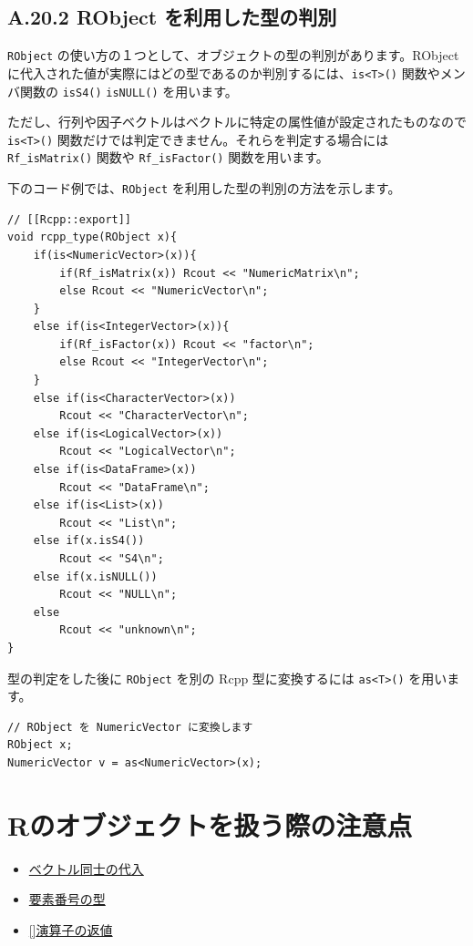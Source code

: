 \documentclass[]{book}
\providecommand{\tightlist}{%
  \setlength{\itemsep}{0pt}\setlength{\parskip}{0pt}}
\begin{document}
\hypertarget{a.20.2-robject-}{%
\section{A.20.2 RObject を利用した型の判別}\label{a.20.2-robject-}}

\texttt{RObject} の使い方の１つとして、オブジェクトの型の判別があります。RObject に代入された値が実際にはどの型であるのか判別するには、\texttt{is\textless{}T\textgreater{}()} 関数やメンバ関数の \texttt{isS4()} \texttt{isNULL()} を用います。

ただし、行列や因子ベクトルはベクトルに特定の属性値が設定されたものなので \texttt{is\textless{}T\textgreater{}()} 関数だけでは判定できません。それらを判定する場合には \texttt{Rf\_isMatrix()} 関数や \texttt{Rf\_isFactor()} 関数を用います。

下のコード例では、\texttt{RObject} を利用した型の判別の方法を示します。

\begin{verbatim}
// [[Rcpp::export]]
void rcpp_type(RObject x){
    if(is<NumericVector>(x)){
        if(Rf_isMatrix(x)) Rcout << "NumericMatrix\n";
        else Rcout << "NumericVector\n";       
    }
    else if(is<IntegerVector>(x)){
        if(Rf_isFactor(x)) Rcout << "factor\n";
        else Rcout << "IntegerVector\n";
    }
    else if(is<CharacterVector>(x))
        Rcout << "CharacterVector\n";
    else if(is<LogicalVector>(x))
        Rcout << "LogicalVector\n";
    else if(is<DataFrame>(x))
        Rcout << "DataFrame\n";
    else if(is<List>(x))
        Rcout << "List\n";
    else if(x.isS4())
        Rcout << "S4\n";
    else if(x.isNULL())
        Rcout << "NULL\n";
    else
        Rcout << "unknown\n";
}
\end{verbatim}

型の判定をした後に \texttt{RObject} を別の Rcpp 型に変換するには \texttt{as\textless{}T\textgreater{}()} を用います。

\begin{verbatim}
// RObject を NumericVector に変換します
RObject x;
NumericVector v = as<NumericVector>(x);
\end{verbatim}

\hypertarget{r}{%
\chapter{Rのオブジェクトを扱う際の注意点}\label{r}}

\begin{itemize}
\tightlist
\item
  \protect\hyperlink{ux30d9ux30afux30c8ux30ebux540cux58ebux306eux4ee3ux5165}{ベクトル同士の代入}
\item
  \protect\hyperlink{}{要素番号の型}
\item
  \protect\hyperlink{ux5cux255Bux5cux255Dux6f14ux7b97ux5b50ux306eux8fd4ux5024}{{[}{]}演算子の返値}
\end{itemize}
\end{document}
